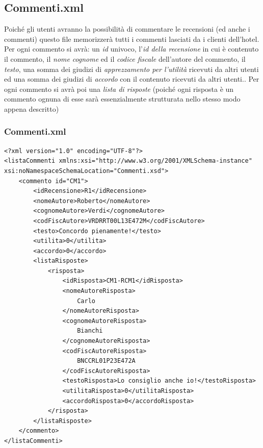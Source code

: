 \documentclass [a4paper, 12pt]{book}
\begin{document}
\subsection{Commenti.xml}
Poiché gli utenti avranno la possibilità di commentare le recensioni (ed anche i commenti) questo file memorizzerà tutti i commenti lasciati da i clienti dell'hotel. Per ogni commento si avrà: un \textit{id} univoco, l'\textit{id della recensione} in cui è contenuto il commento, il \textit{nome} \textit{cognome} ed il \textit{codice fiscale} dell'autore del commento, il \textit{testo}, una somma dei giudizi di \textit{apprezzamento per l'utilità} ricevuti da altri utenti ed una somma dei giudizi di \textit{accordo} con il contenuto ricevuti da altri utenti.. Per ogni commento si avrà poi una \textit{lista di risposte} (poiché ogni risposta è un commento ognuna di esse sarà essenzialmente strutturata nello stesso modo appena descritto)

\subsubsection{Commenti.xml}
\begin{lstlisting}[style=XML]
<?xml version="1.0" encoding="UTF-8"?>
<listaCommenti xmlns:xsi="http://www.w3.org/2001/XMLSchema-instance" xsi:noNamespaceSchemaLocation="Commenti.xsd">
    <commento id="CM1">
        <idRecensione>R1</idRecensione>
        <nomeAutore>Roberto</nomeAutore>
        <cognomeAutore>Verdi</cognomeAutore>
        <codFiscAutore>VRDRRT00L13E472M</codFiscAutore>
        <testo>Concordo pienamente!</testo>
        <utilita>0</utilita>
        <accordo>0</accordo>
        <listaRisposte>
            <risposta>
            	<idRisposta>CM1-RCM1</idRisposta>
                <nomeAutoreRisposta>
                	Carlo
                </nomeAutoreRisposta>
                <cognomeAutoreRisposta>
                	Bianchi
                </cognomeAutoreRisposta>
                <codFiscAutoreRisposta>
                	BNCCRL01P23E472A
                </codFiscAutoreRisposta>
                <testoRisposta>Lo consiglio anche io!</testoRisposta>
                <utilitaRisposta>0</utilitaRisposta>
                <accordoRisposta>0</accordoRisposta>
            </risposta>
        </listaRisposte>
    </commento>
</listaCommenti>
\end{lstlisting}
\end{document}
